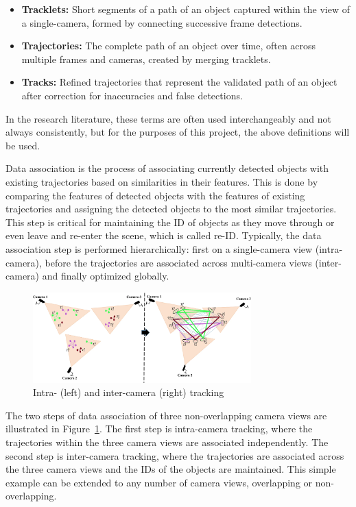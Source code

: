 \begin{itemize}
    \item \textbf{Tracklets:} Short segments of a path of an object captured within the view of a single-camera, formed by connecting successive frame detections.
    \item \textbf{Trajectories:} The complete path of an object over time, often across multiple frames and cameras, created by merging tracklets.
    \item \textbf{Tracks:} Refined trajectories that represent the validated path of an object after correction for inaccuracies and false detections.
\end{itemize}

In the research literature, these terms are often used interchangeably and not always consistently, but for the purposes of this project, the above definitions will be used.

Data association is the process of associating currently detected objects with existing trajectories based on similarities in their features. This is done by comparing the features of detected objects with the features of existing trajectories and assigning the detected objects to the most similar trajectories. This step is critical for maintaining the ID of objects as they move through or even leave and re-enter the scene, which is called re-ID. Typically, the data association step is performed hierarchically: first on a single-camera view (intra-camera), before the trajectories are associated across multi-camera views (inter-camera) and finally optimized globally.

\begin{figure}[ht]
    \centering
    \includegraphics[width=0.75\textwidth]{resources/fig/Tesfaye19-intra_inter_camera_tracking.png}
    \caption{Intra- (left) and inter-camera (right) tracking~\cite[Fig.~1]{Tesfaye19}}\label{fig:intra_inter_camera_tracking}
\end{figure}

The two steps of data association of three non-overlapping camera views are illustrated in Figure~\ref{fig:intra_inter_camera_tracking}. The first step is intra-camera tracking, where the trajectories within the three camera views are associated independently. The second step is inter-camera tracking, where the trajectories are associated across the three camera views and the IDs of the objects are maintained. This simple example can be extended to any number of camera views, overlapping or non-overlapping.


